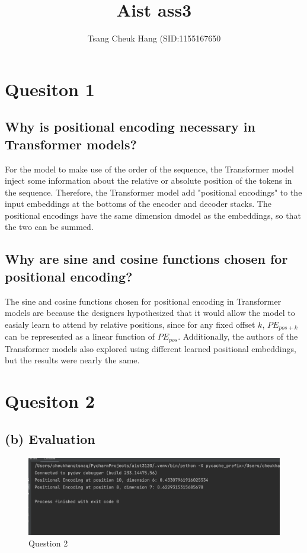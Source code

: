 \documentclass{article}
\title{Aist ass3}
\author{Tsang Cheuk Hang (SID:1155167650}
\begin{document}
\maketitle

\section{Quesiton 1}
\subsection{Why is positional encoding necessary in Transformer models?}

For the model to make use of the order of the sequence, the Transformer model inject some information about the relative or absolute position of the tokens in the sequence. Therefore, the Transformer model add "positional encodings" to the input embeddings at the bottoms of the encoder and decoder stacks. The positional encodings have the same dimension dmodel as the embeddings, so that the two can be summed.

\subsection{Why are sine and cosine functions chosen for positional encoding?}

The sine and cosine functions chosen for positional encoding in Transformer models are because the designers hypothesized that it would allow the model to easialy learn to attend by relative positions, since for any fixed offset $k$, $PE_{pos+k}$ can be represented as a linear function of $PE_{pos}$. Additionally, the authors of the Transformer models also explored using different learned positional embeddings, but the results were nearly the same.

\section{Quesiton 2}
\subsection{(b) Evaluation}
\begin{figure}
    \centering
    \includegraphics[width=1\linewidth]{image.png}
    \caption{Question 2}
    \label{fig:enter-label}
\end{figure}
\end{document}
